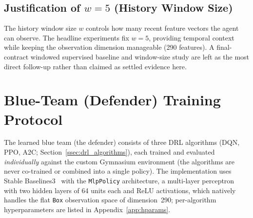 \subsection{Justification of \texorpdfstring{$w = 5$}{w = 5} (History Window Size)}\label{ssec:window_justification}
The history window size $w$ controls how many recent feature vectors the agent can observe. The headline experiments fix $w = 5$, providing temporal context while keeping the observation dimension manageable (290 features). A final-contract windowed supervised baseline and window-size study are left as the most direct follow-up rather than claimed as settled evidence here.

\section{Blue-Team (Defender) Training Protocol}\label{sec:drl_training}
The learned blue team (the defender) consists of three DRL algorithms (DQN, PPO, A2C; Section~\ref{ssec:drl_algorithms}), each trained and evaluated \emph{individually} against the custom Gymnasium environment (the algorithms are never co-trained or combined into a single policy). The implementation uses Stable Baselines3~\cite{Raffin2021} with the \texttt{MlpPolicy} architecture, a multi-layer perceptron with two hidden layers of 64 units each and ReLU activations, which natively handles the flat \texttt{Box} observation space of dimension~290; per-algorithm hyperparameters are listed in Appendix~\ref{app:hparams}.

